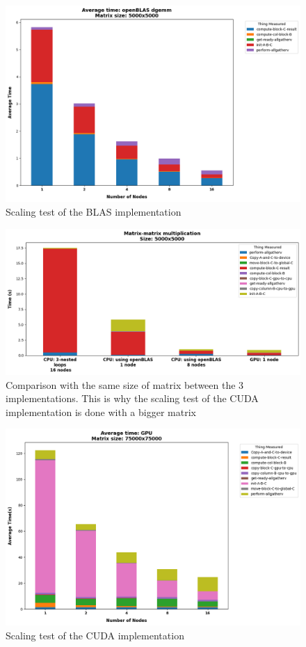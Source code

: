 \documentclass{article}
\begin{document}
    \begin{figure}
        \includegraphics[width=\textwidth]{plots/02-openblas}
        \caption{Scaling test of the BLAS implementation}
    \end{figure}

    \begin{figure}
        \includegraphics[width=\textwidth]{plots/05-GPU_vs_CPU}
        \caption{Comparison with the same size of matrix between the 3 implementations. This is why the scaling test of the CUDA implementation is done with a bigger matrix}
    \end{figure}

    \begin{figure}
        \includegraphics[width=\textwidth]{plots/06_GPU_scaling}
        \caption{Scaling test of the CUDA implementation}
    \end{figure}
\end{document}
